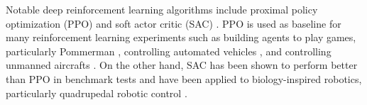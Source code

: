   Notable deep reinforcement learning algorithms include proximal policy optimization (PPO) \cite{schulman2017proximal} and soft actor critic (SAC) \cite{haarnoja2018soft}.
  PPO is used as baseline for many reinforcement learning experiments such as building agents to play games, particularly Pommerman \cite{gao2019skynet}, controlling automated vehicles \cite{guan2020centralized}, and controlling unmanned aircrafts \cite{bohn2019deep}.
  On the other hand, SAC has been shown to perform better than PPO in benchmark tests and have been applied to biology-inspired robotics, particularly quadrupedal robotic control \cite{haarnoja2018softappli}.

